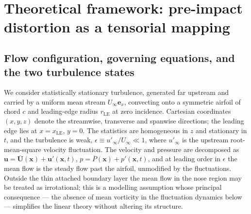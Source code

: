 \documentclass[lineno]{JFM-FLM_Au}
\begin{document}
\section{Theoretical framework: pre-impact distortion as a tensorial mapping}
\label{sec:framework}

\subsection{Flow configuration, governing equations, and the two turbulence
states}
\label{sec:framework_states}

We consider statistically stationary turbulence, generated far upstream and
carried by a uniform mean stream $U_\infty\boldsymbol{e}_x$, convecting onto
a symmetric airfoil of chord $c$ and leading-edge radius $r_{\mathrm{LE}}$
at zero incidence. Cartesian coordinates $(x,y,z)$ denote the streamwise,
transverse and spanwise directions; the leading edge lies at
$x = x_{\mathrm{LE}}$, $y = 0$. The statistics are homogeneous in $z$ and
stationary in $t$, and the turbulence is weak,
$\epsilon \equiv u'_\infty/U_\infty \ll 1$, where $u'_\infty$ is the
upstream root-mean-square velocity fluctuation. The velocity and pressure
are decomposed as
$\boldsymbol{u} = \overline{\boldsymbol{U}}(\boldsymbol{x})
+ \boldsymbol{u}'(\boldsymbol{x},t)$,
$p = \overline{P}(\boldsymbol{x}) + p'(\boldsymbol{x},t)$, and at leading
order in $\epsilon$ the mean flow is the steady flow past the airfoil,
unmodified by the fluctuations. Outside the thin attached boundary layer
the mean flow in the nose region may be treated as irrotational; this is a
modelling assumption whose principal consequence --- the absence of mean
vorticity in the fluctuation dynamics below --- simplifies the linear
theory without altering its structure.
\end{document}
